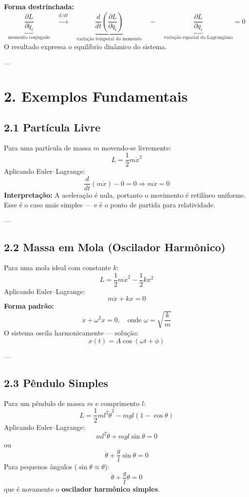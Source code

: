 \documentclass[a4paper,12pt]{article}
\begin{document}
\noindent
\textbf{Forma destrinchada:}
\[
\underbrace{\frac{\partial L}{\partial \dot{q_i}}}_{\text{momento conjugado}} 
\quad \xrightarrow{d/dt} \quad
\underbrace{\frac{d}{dt}\left( \frac{\partial L}{\partial \dot{q_i}} \right)}_{\text{variação temporal do momento}} 
\quad - \quad
\underbrace{\frac{\partial L}{\partial q_i}}_{\text{variação espacial da Lagrangiana}} = 0
\]
O resultado expressa o equilíbrio dinâmico do sistema.

---

\section*{2. Exemplos Fundamentais}

\subsection*{2.1 Partícula Livre}
Para uma partícula de massa $m$ movendo-se livremente:
\[
L = \frac{1}{2} m \dot{x}^2
\]
Aplicando Euler–Lagrange:
\[
\frac{d}{dt}\left( m \dot{x} \right) - 0 = 0 \Rightarrow m \ddot{x} = 0
\]
\textbf{Interpretação:} A aceleração é nula, portanto o movimento é retilíneo uniforme.
Esse é o caso mais simples — e é o ponto de partida para relatividade.

---

\subsection*{2.2 Massa em Mola (Oscilador Harmônico)}
Para uma mola ideal com constante $k$:
\[
L = \frac{1}{2} m \dot{x}^2 - \frac{1}{2} k x^2
\]
Aplicando Euler–Lagrange:
\[
m \ddot{x} + kx = 0
\]
\textbf{Forma padrão:}
\[
\ddot{x} + \omega^2 x = 0, \quad \text{onde } \omega = \sqrt{\frac{k}{m}}
\]
O sistema oscila harmonicamente — solução:
\[
x(t) = A \cos(\omega t + \phi)
\]

---

\subsection*{2.3 Pêndulo Simples}
Para um pêndulo de massa $m$ e comprimento $l$:
\[
L = \frac{1}{2} m l^2 \dot{\theta}^2 - mgl(1 - \cos\theta)
\]
Aplicando Euler–Lagrange:
\[
m l^2 \ddot{\theta} + mgl \sin\theta = 0
\]
ou
\[
\ddot{\theta} + \frac{g}{l}\sin\theta = 0
\]
Para pequenos ângulos ($\sin\theta \approx \theta$):
\[
\ddot{\theta} + \frac{g}{l}\theta = 0
\]
que é novamente o \textbf{oscilador harmônico simples}.
\end{document}
